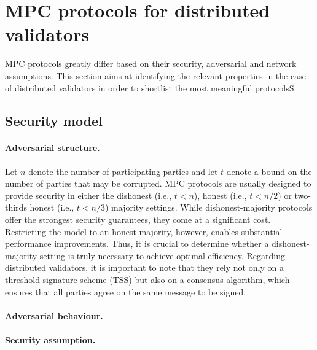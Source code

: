 \section{MPC protocols for distributed validators}
MPC protocols greatly differ based on their security, adversarial and network assumptions. This section aims at identifying the relevant properties in the case of distributed validators in order to shortlist the most meaningful protocolsS.
\subsection{Security model}
\paragraph{Adversarial structure.}
Let $n$ denote the number of participating parties and let $t$ denote a bound on the number of parties that may be corrupted.
MPC protocols are usually designed to provide security in either the dishonest (i.e., $t < n$), honest (i.e., $t < n/2$) or two-thirds honest (i.e., $t < n/3$) majority settings.
While dishonest-majority protocols offer the strongest security guarantees, they come at a significant cost.
Restricting the model to an honest majority, however, enables substantial performance improvements.
Thus, it is crucial to determine whether a dishonest-majority setting is truly necessary to achieve optimal efficiency.
Regarding distributed validators, it is important to note that they rely not only on a threshold signature scheme (TSS) but also on a consensus algorithm, which ensures that all parties agree on the same message to be  signed.
 
\paragraph{Adversarial behaviour.}

\paragraph{Security assumption.}